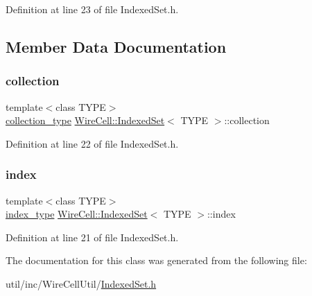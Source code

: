 Definition at line 23 of file Indexed\+Set.\+h.



\subsection{Member Data Documentation}
\mbox{\label{class_wire_cell_1_1_indexed_set_a1fc4f16507b418ea2b768ff40f5289c8}} 
\subsubsection{\texorpdfstring{collection}{collection}}
{\footnotesize\ttfamily template$<$class T\+Y\+PE$>$ \\
\hyperlink{class_wire_cell_1_1_indexed_set_afd3398c28ed5729c35664d26d6249ed4}{collection\+\_\+type} \hyperlink{class_wire_cell_1_1_indexed_set}{Wire\+Cell\+::\+Indexed\+Set}$<$ T\+Y\+PE $>$\+::collection}



Definition at line 22 of file Indexed\+Set.\+h.

\mbox{\label{class_wire_cell_1_1_indexed_set_a96af7dbb2545b3247831e1150a52b10c}} 
\subsubsection{\texorpdfstring{index}{index}}
{\footnotesize\ttfamily template$<$class T\+Y\+PE$>$ \\
\hyperlink{class_wire_cell_1_1_indexed_set_ad9f54ba896d3c199df2cc233f16c5327}{index\+\_\+type} \hyperlink{class_wire_cell_1_1_indexed_set}{Wire\+Cell\+::\+Indexed\+Set}$<$ T\+Y\+PE $>$\+::index}



Definition at line 21 of file Indexed\+Set.\+h.



The documentation for this class was generated from the following file\+:\begin{DoxyCompactItemize}
\item 
util/inc/\+Wire\+Cell\+Util/\hyperlink{_indexed_set_8h}{Indexed\+Set.\+h}\end{DoxyCompactItemize}
